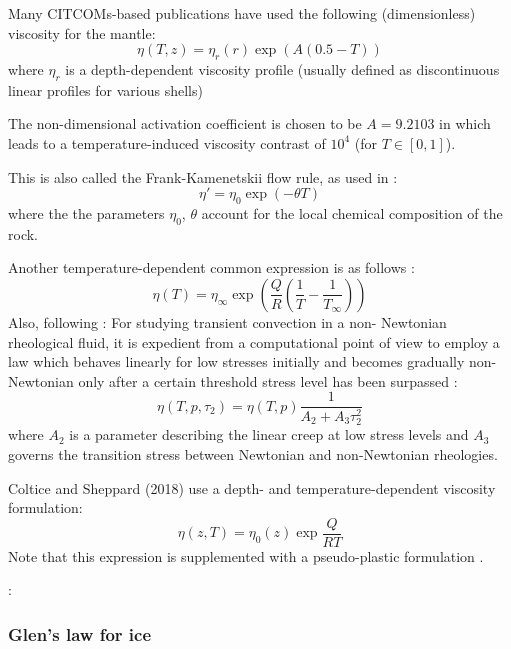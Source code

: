 Many CITCOMs-based publications \cite{bumb10,budt14} 
have used the following (dimensionless) viscosity for the mantle:
\[
\eta(T,z) = \eta_r(r) \exp(A(0.5-T))
\]
where $\eta_r$ is a depth-dependent viscosity profile (usually defined as 
discontinuous linear profiles for various shells)

The non-dimensional activation coefficient is chosen to be $A=9.2103$ in 
\cite{budt14} which leads to a temperature-induced viscosity contrast of $10^4$ (for 
$T\in[0,1]$).

This is also called the Frank-Kamenetskii flow rule, as used in \cite{stha13,lemh17}:
\[
\eta' = \eta_0 \exp(-\theta T)
\]
where the the parameters $\eta_0$, $\theta$ account for the local chemical composition of the rock.

Another temperature-dependent common expression is as follows \cite{flyu84}:
\[
\eta(T)=\eta_\infty \exp \left( \frac{Q}{R}(\frac{1}{T}-\frac{1}{T_\infty} ) \right)
\]
Also, following \cite{flyu84}: For studying transient convection in a non-
Newtonian rheological fluid, it is expedient from a
computational point of view to employ a law
which behaves linearly for low stresses initially
and becomes gradually non-Newtonian only after
a certain threshold stress level has been surpassed \cite{chri84,chyu84}:
\[
\eta(T,p,\tau_2) =\eta(T,p) \frac{1}{A_2 + A_3 \tau_2^2}
\]
where $A_2$ is a parameter describing the linear creep
at low stress levels and $A_3$ governs the transition
stress between Newtonian and non-Newtonian rheologies.

Coltice and Sheppard (2018) \cite{cosh18} use a depth- and temperature-dependent 
viscosity formulation:
\[
\eta(z,T)=\eta_0(z) \exp \frac{Q}{RT}
\]
Note that this expression is supplemented with a pseudo-plastic formulation \cite{roct12}.

\Literature: \cite{king16}

\subsubsection{Glen's law for ice}\label{ss:glen}


